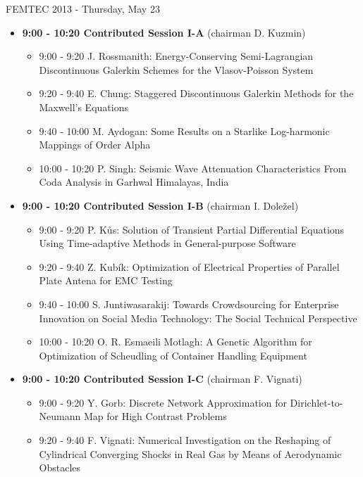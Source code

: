 \documentclass[10pt, A4]{article}%
\begin{document}
\newpage
\newpage

\centerline{\huge FEMTEC 2013 - Thursday, May 23}
\vspace{4mm}

\begin{itemize}    
\item {\bf 9:00 - 10:20 Contributed Session I-A} (chairman D. Kuzmin) 
  \begin{itemize}
    \item 9:00 - 9:20 {J. Rossmanith}: {Energy-Conserving Semi-Lagrangian Discontinuous Galerkin Schemes for the Vlasov-Poisson System} %
    \item 9:20 - 9:40 {E. Chung}: {Staggered Discontinuous Galerkin Methods for the Maxwell's Equations}   
    \item 9:40 - 10:00 {M. Aydogan}: {Some  Results on a Starlike  Log-harmonic Mappings of Order Alpha} %
    \item 10:00 - 10:20  {P. Singh}: {Seismic Wave Attenuation Characteristics  From Coda Analysis in Garhwal Himalayas, India} %
  \end{itemize}
  \item {\bf 9:00 - 10:20 Contributed Session I-B} (chairman I. Doležel) 
  \begin{itemize}
    \item 9:00 - 9:20 {P. Kůs}: {Solution of Transient Partial Differential Equations Using Time-adaptive Methods in General-purpose Software}
    \item 9:20 - 9:40 {Z. Kubík}: {Optimization of Electrical Properties of Parallel Plate Antena for EMC Testing}
    \item 9:40 - 10:00 {S. Juntiwasarakij}: {Towards Crowdsourcing for Enterprise Innovation on Social Media Technology: The Social Technical Perspective} %
    \item 10:00 - 10:20 {O. R. Esmaeili Motlagh}: {A Genetic Algorithm for Optimization of Scheudling of Container Handling Equipment}
  \end{itemize}
    \item {\bf 9:00 - 10:20 Contributed Session I-C} (chairman F. Vignati) 
  \begin{itemize}
    \item 9:00 - 9:20 {Y. Gorb}: {Discrete Network Approximation for Dirichlet-to-Neumann Map for High Contrast Problems} %
    \item 9:20 - 9:40 {F. Vignati}: {Numerical Investigation on the Reshaping of Cylindrical Converging Shocks in Real Gas by Means of Aerodynamic Obstacles}

\end{itemize}
\end{itemize}
\end{document}
